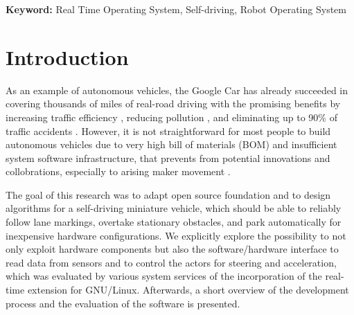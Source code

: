 \par{\noindent \bf Keyword:}{ Real Time Operating System, Self-driving, Robot Operating System}
\clearpage
{}


\renewcommand*\contentsname{Table of Contents}
\singlespacing
\newpage
{}
\pagestyle{plain}
\tableofcontents
\clearpage
{}

\listoftables
\listoffigures


\setcounter{page}{1}
\newpage
{}
\chapter{Introduction}
\pagestyle{plain}

\begin{spacing}{2.0}

As an example of autonomous vehicles, the Google Car has already succeeded in covering thousands of miles of real-road driving \cite{autonomous} with the promising benefits by increasing traffic efficiency \cite{traffic-flow}, reducing pollution \cite{reduce-pollution}, and eliminating up to 90\% of traffic accidents \cite{traffic-accident}. However, it is not straightforward for most people to build autonomous vehicles due to very high bill of materials (BOM) and insufficient system software infrastructure, that prevents from potential innovations and collobrations, especially to arising maker movement \cite{maker}.

The goal of this research was to adapt open source foundation and to design algorithms for a self-driving miniature vehicle, which should be able to reliably follow lane markings, overtake stationary obstacles, and park automatically for inexpensive hardware configurations. We explicitly explore the possibility to not only exploit hardware components but also the software/hardware interface to read data from sensors and to control the actors for steering and acceleration, which was evaluated by various system services of the incorporation of the real-time extension for GNU/Linux. Afterwards, a short overview of the development process and the evaluation of the software is presented.

\end{spacing}

